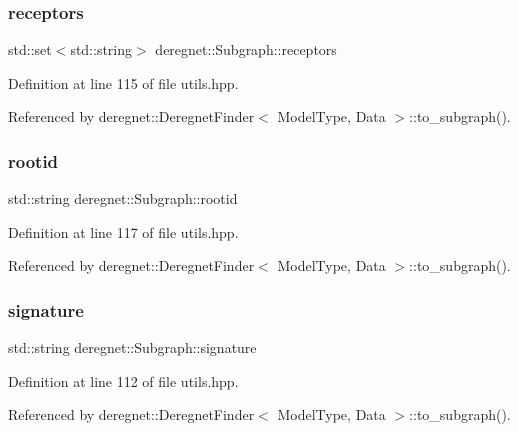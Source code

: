 \subsubsection{\texorpdfstring{receptors}{receptors}}
{\footnotesize\ttfamily std\+::set$<$std\+::string$>$ deregnet\+::\+Subgraph\+::receptors}



Definition at line 115 of file utils.\+hpp.



Referenced by deregnet\+::\+Deregnet\+Finder$<$ Model\+Type, Data $>$\+::to\+\_\+subgraph().

\mbox{\label{structderegnet_1_1Subgraph_a0e214a14649dcd35959c619cbdd9ce2b}} 
\subsubsection{\texorpdfstring{rootid}{rootid}}
{\footnotesize\ttfamily std\+::string deregnet\+::\+Subgraph\+::rootid}



Definition at line 117 of file utils.\+hpp.



Referenced by deregnet\+::\+Deregnet\+Finder$<$ Model\+Type, Data $>$\+::to\+\_\+subgraph().

\mbox{\label{structderegnet_1_1Subgraph_aae642b8b0b71de5539218040b0d7e201}} 
\subsubsection{\texorpdfstring{signature}{signature}}
{\footnotesize\ttfamily std\+::string deregnet\+::\+Subgraph\+::signature}



Definition at line 112 of file utils.\+hpp.



Referenced by deregnet\+::\+Deregnet\+Finder$<$ Model\+Type, Data $>$\+::to\+\_\+subgraph().

\mbox{\label{structderegnet_1_1Subgraph_a030ed025dd1e2e38c48147283a93bd61}} 

